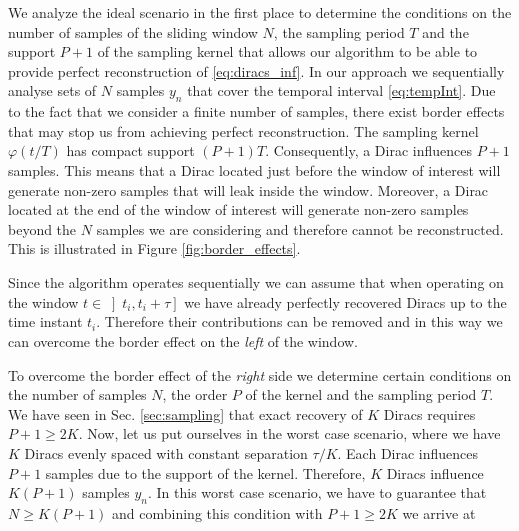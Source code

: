 \documentclass{article}
\providecommand{\red}[1]{\textcolor{red}{#1}}
\begin{document}
We analyze the ideal scenario in the first place to determine the conditions 
on the number of samples of the sliding window $N$, the sampling period $T$
and the support $P+1$ of the sampling kernel that allows our algorithm 
to be able to provide perfect reconstruction of \eqref{eq:diracs_inf}. In our 
approach we sequentially analyse sets of $N$ samples $y_n$ that cover the 
temporal interval \eqref{eq:tempInt}. 
Due to the fact that we consider a finite number of samples, there exist 
border effects that may stop us from achieving perfect reconstruction. 
The sampling kernel $\varphi(t/T)$ has compact support $(P+1)T$. Consequently, a Dirac influences 
$P+1$ samples. This means that a Dirac located just before the window of interest 
will generate non-zero samples that will leak inside 
the window. Moreover, a Dirac located at the end of the window of interest will 
generate non-zero samples beyond the $N$ samples we are considering and
therefore cannot be reconstructed. This is illustrated in Figure \ref{fig:border_effects}.

Since the algorithm operates sequentially we can assume that when operating on the window 
$t \in \left] t_i, t_i + \tau \right]$
we have already perfectly recovered Diracs up to the time instant $t_i$. Therefore 
their contributions can be removed and 
in this way we can overcome the border effect on the {\em left} of the window.

To overcome the border effect of the \textit{right}
side we determine certain conditions on the number of samples $N$,
the order $P$ of the kernel and the sampling period $T$. 
We have seen in Sec. \ref{sec:sampling} that exact recovery of $K$ Diracs requires
$P+1 \geq 2K$. 
Now, let us put ourselves in the worst case scenario, where we have $K$ Diracs evenly spaced 
with constant separation $\tau / K$. Each Dirac influences $P+1$ samples due to the support of the kernel.
Therefore, $K$ Diracs influence $K(P+1)$ samples $y_n$.
In this worst case scenario, we have to guarantee that $N \geq K (P+1)$ and combining this condition
with $P+1 \geq 2K$ we arrive at
\end{document}

